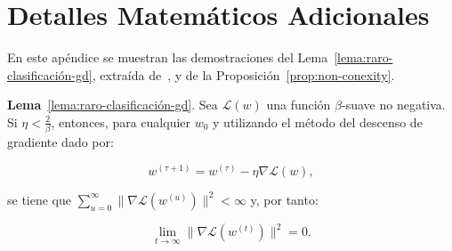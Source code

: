 
\chapter{Detalles Matemáticos Adicionales}\label{ap:apendiceA}

En este apéndice se muestran las demostraciones del Lema~\ref{lema:raro-clasificación-gd}, extraída de~\cite{Soudry2024}, y de la Proposición~\ref{prop:non-conexity}.

\textbf{Lema}~\ref{lema:raro-clasificación-gd}. Sea $\mathcal{L}(w)$ una función $\beta$-suave no negativa. Si $\eta < \frac{2}{\beta}$, entonces, para cualquier $w_0$ y utilizando el método del descenso de gradiente dado por:

\[
    w^{(\tau + 1)} = w^{(\tau)} - \eta \nabla \mathcal{L}(w),
\]

se tiene que $\sum_{u=0}^{\infty} \| \nabla\mathcal{L}(w^{(u)}) \|^{2} < \infty$ y, por tanto:

\[
    \lim \limits_{t \to \infty} \| \nabla\mathcal{L}(w^{(t)}) \|^{2} = 0.
\]

